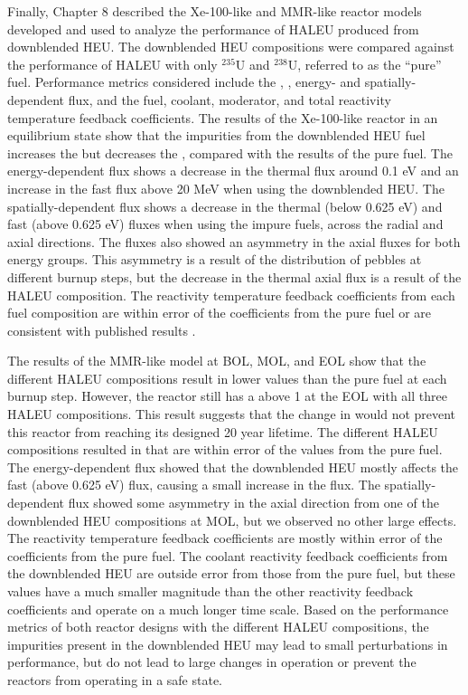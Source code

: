 Finally, Chapter 8 described the Xe-100-like and 
\gls{MMR}-like reactor models developed and 
used to analyze the performance of \gls{HALEU} produced from 
downblended \gls{HEU}. The downblended \gls{HEU} compositions 
were compared against the performance of \gls{HALEU} with only 
$^{235}$U and $^{238}$U, referred to as the ``pure'' fuel. 
Performance metrics considered include the 
\keff, \betaEff, energy- and spatially-dependent flux, and 
the fuel, coolant, moderator, and total reactivity temperature 
feedback coefficients. The results of the Xe-100-like 
reactor in an equilibrium state show that the impurities from 
the downblended 
\gls{HEU} fuel increases the \keff but decreases the \betaEff, 
compared with the results of the pure fuel. 
The energy-dependent flux shows a decrease in the thermal flux 
around 0.1 eV and an increase in the fast flux above 20 MeV 
when using the downblended \gls{HEU}. The spatially-dependent 
flux shows a decrease in the thermal (below 0.625 eV) and 
fast (above 0.625 eV) fluxes when using the impure fuels, 
across the radial and axial directions. 
The fluxes also showed an asymmetry 
in the axial fluxes for both energy groups. This asymmetry 
is a result of the distribution of pebbles at different 
burnup steps, but the decrease in the thermal axial 
flux is a result of the \gls{HALEU} composition.
 The reactivity temperature 
feedback coefficients from each fuel composition are within 
error of the coefficients from the pure fuel or are consistent 
with published results \cite{mulder_neutronics_2020}.

The results of the \gls{MMR}-like model at \gls{BOL}, \gls{MOL}, 
and \gls{EOL} show that the different \gls{HALEU} compositions 
result in lower \keff values than the pure fuel at each burnup 
step. However, 
the reactor still has a \keff above 1 at the \gls{EOL} with all 
three \gls{HALEU} compositions. 
This result suggests that the change in \keff would not prevent this 
reactor from reaching its designed 20 year lifetime. The 
different \gls{HALEU} compositions resulted in \betaEff that 
are within error of the values from the pure fuel. The 
energy-dependent 
flux showed that the downblended \gls{HEU} mostly affects 
the fast (above 0.625 eV) flux, causing a small increase in 
the flux. The spatially-dependent flux showed some 
asymmetry in the axial direction from one of the downblended 
\gls{HEU} compositions at \gls{MOL}, but we observed no other large 
effects. The reactivity temperature feedback coefficients 
are mostly within error of the coefficients from the pure fuel. 
The coolant reactivity feedback coefficients from the downblended 
\gls{HEU} are outside error from those from the pure fuel, 
but these values have a much smaller magnitude than the other 
reactivity feedback coefficients and operate on a much 
longer time scale. Based on the performance metrics of 
both reactor designs with the different \gls{HALEU} 
compositions, the impurities present in the downblended 
\gls{HEU} may lead to small perturbations in performance, but do 
not lead to large changes in operation or prevent the 
reactors from operating in a safe state. 
 
